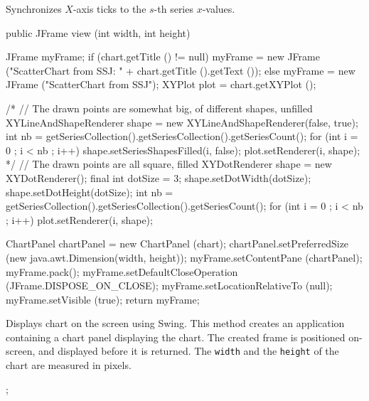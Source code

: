 \begin{tabb}
   Synchronizes $X$-axis ticks to the $s$-th series $x$-values.
\end{tabb}
\begin{htmlonly}
\end{htmlonly}
\begin{code}

   public JFrame view (int width, int height) \begin{hide} {
      JFrame myFrame;
      if (chart.getTitle () != null)
         myFrame = new JFrame ("ScatterChart from SSJ: " + chart.getTitle ().getText ());
      else
         myFrame = new JFrame ("ScatterChart from SSJ");
      XYPlot plot = chart.getXYPlot ();

/*    // The drawn points are somewhat big, of different shapes, unfilled
      XYLineAndShapeRenderer shape = new XYLineAndShapeRenderer(false, true);
      int nb = getSeriesCollection().getSeriesCollection().getSeriesCount();
      for (int i = 0 ; i < nb ; i++) {
         shape.setSeriesShapesFilled(i, false);
         plot.setRenderer(i, shape);
      }
*/
      // The drawn points are all square, filled
      XYDotRenderer shape = new XYDotRenderer();
      final int dotSize = 3;
      shape.setDotWidth(dotSize);
      shape.setDotHeight(dotSize);
      int nb = getSeriesCollection().getSeriesCollection().getSeriesCount();
      for (int i = 0 ; i < nb ; i++)
         plot.setRenderer(i, shape);

      ChartPanel chartPanel = new ChartPanel (chart);
      chartPanel.setPreferredSize (new java.awt.Dimension(width, height));
      myFrame.setContentPane (chartPanel);
      myFrame.pack();
      myFrame.setDefaultCloseOperation (JFrame.DISPOSE_ON_CLOSE);
      myFrame.setLocationRelativeTo (null);
      myFrame.setVisible (true);
      return myFrame;
   }\end{hide}
\end{code}
\begin{tabb}
   Displays chart on the screen using Swing.
   This method creates an application containing a chart panel displaying
   the chart. The created frame is positioned on-screen, and displayed before
   it is returned. The \texttt{width} and the \texttt{height}
   of the chart are measured in pixels.
\end{tabb}
\begin{htmlonly}
   ;
\end{htmlonly}


